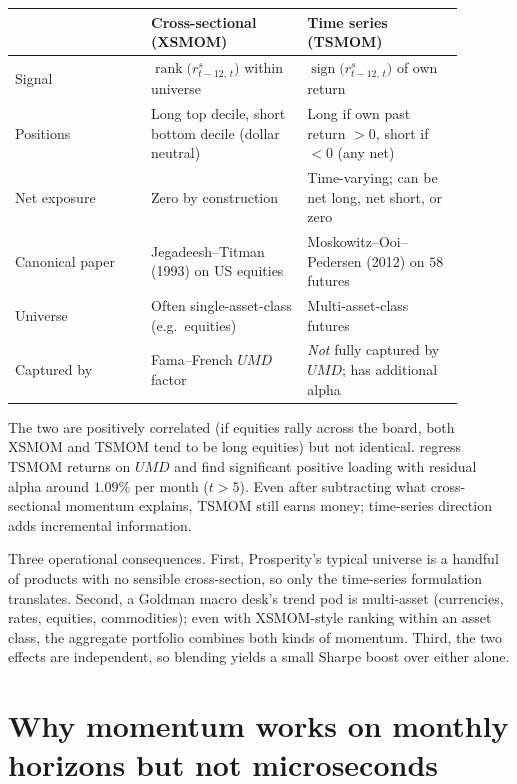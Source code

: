 \begin{keyfactbox}
\label{kf:two_momentums}
\renewcommand{\arraystretch}{1.2}
\begin{center}
\begin{tabular}{p{0.27\linewidth} p{0.31\linewidth} p{0.31\linewidth}}
\toprule
 & \textbf{Cross-sectional (XSMOM)} & \textbf{Time series (TSMOM)} \\
\midrule
Signal &
$\operatorname{rank}\!\bigl(r^s_{t-12,\,t}\bigr)$
within universe &
$\operatorname{sign}\!\bigl(r^s_{t-12,\,t}\bigr)$
of own return \\
Positions &
Long top decile, short bottom decile (dollar neutral) &
Long if own past return $> 0$, short if $< 0$ (any net) \\
Net exposure &
Zero by construction &
Time-varying; can be net long, net short, or zero \\
Canonical paper &
Jegadeesh--Titman (1993) on US equities &
Moskowitz--Ooi--Pedersen (2012) on $58$ futures \\
Universe &
Often single-asset-class (e.g.\ equities) &
Multi-asset-class futures \\
Captured by &
Fama--French $\textit{UMD}$ factor &
\emph{Not} fully captured by $\textit{UMD}$; has additional alpha \\
\bottomrule
\end{tabular}
\end{center}
\end{keyfactbox}

The two are positively correlated (if equities rally across
the board, both XSMOM and TSMOM tend to be long equities) but
not identical. \citeMOP{} regress TSMOM returns on $\textit{UMD}$
and find significant positive loading with residual alpha around
$1.09\%$ per month ($t > 5$). Even after subtracting what
cross-sectional momentum explains, TSMOM still earns money;
time-series direction adds incremental information.

Three operational consequences. First, Prosperity's typical
universe is a handful of products with no sensible cross-section,
so only the time-series formulation translates. Second, a Goldman
macro desk's trend pod is multi-asset (currencies, rates,
equities, commodities); even with XSMOM-style ranking within an
asset class, the aggregate portfolio combines both kinds of
momentum. Third, the two effects are independent, so blending
yields a small Sharpe boost over either alone.

\section{Why momentum works on monthly horizons but not microseconds}
\label{sec:ch12_horizons}

